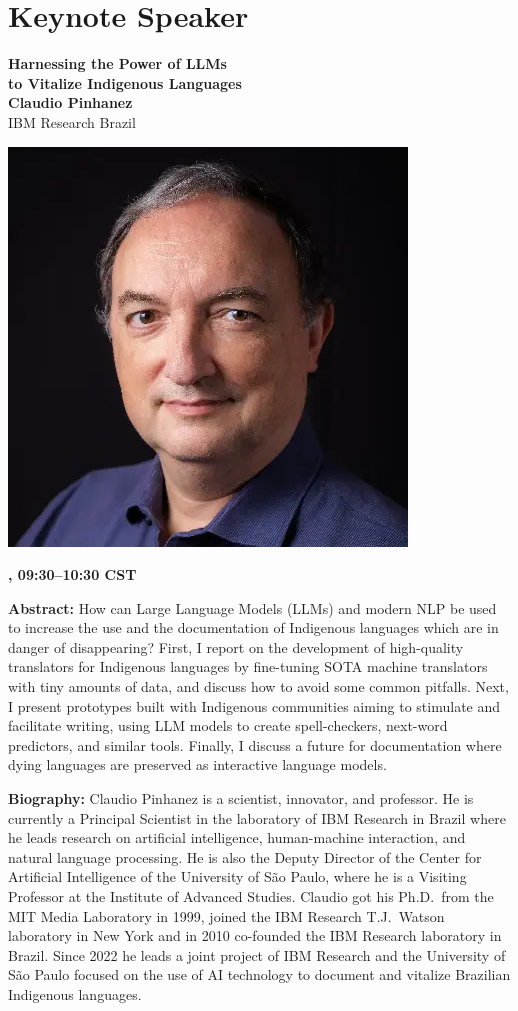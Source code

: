 \newpage
\section{Keynote Speaker}

\begin{center}
{\bfseries\Large Harnessing the Power of LLMs\\\vspace{2.0\lineskip}to Vitalize Indigenous Languages} \\
\vspace{1.0em}
{\large\bf Claudio Pinhanez} \\
IBM Research Brazil

\includegraphics[width=0.4\linewidth]{content/day1/claudio-headshot.png}

\textbf{\daydateyear{}, 09:30--10:30 CST}\\
\textbf{\PlenaryLoc{}}
\end{center}

\noindent
{\bfseries Abstract:} How can Large Language Models (LLMs) and modern NLP be used to increase the use and the documentation of Indigenous languages which are in danger of disappearing? First, I report on the development of high-quality translators for Indigenous languages by fine-tuning SOTA machine translators with tiny amounts of data, and discuss how to avoid some common pitfalls. Next, I present prototypes built with Indigenous communities aiming to stimulate and facilitate writing, using LLM models to create spell-checkers, next-word predictors, and similar tools. Finally, I discuss a future for documentation where dying languages are preserved as interactive language models.

\vspace{1em}

{\bfseries Biography:} 
Claudio Pinhanez is a scientist, innovator, and professor. He is currently a Principal Scientist in the laboratory of IBM Research in Brazil where he leads research on artificial intelligence, human-machine interaction, and natural language processing. He is also the Deputy Director of the Center for Artificial Intelligence of the University of S\~ao Paulo, where he is a Visiting Professor at the Institute of Advanced Studies. Claudio got his Ph.D.~from the MIT Media Laboratory in 1999, joined the IBM Research T.J.~Watson laboratory in New York and in 2010 co-founded the IBM Research laboratory in Brazil. Since 2022 he leads a joint project of IBM Research and the University of S\~ao Paulo focused on the use of AI technology to document and vitalize Brazilian Indigenous languages.

\newpage
